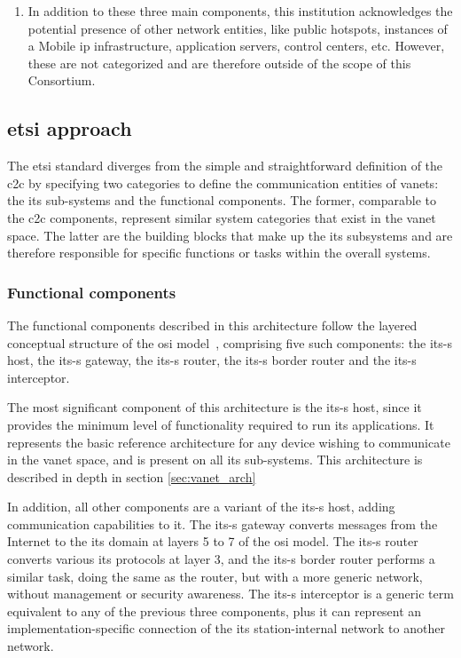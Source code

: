 \begin{enumerate}
    \item In addition to these three main components, this institution acknowledges the potential presence of other network entities, like public hotspots, instances of a Mobile \gls{ip} infrastructure, application servers, control centers, etc. However, these are not categorized and are therefore outside of the scope of this Consortium.

\end{enumerate}

\subsection[ETSI approach]{\gls{etsi} approach}

The \gls{etsi} standard diverges from the simple and straightforward definition of the \gls{c2c} by specifying two categories to define the communication entities of \glspl{vanet}: the \gls{its} sub-systems and the functional components. The former, comparable to the \gls{c2c} components, represent similar system categories that exist in the \gls{vanet} space. The latter are the building blocks that make up the \gls{its} subsystems and are therefore responsible for specific functions or tasks within the overall systems.

\subsubsection{Functional components}

The functional components described in this architecture follow the layered conceptual structure of the \gls{osi} model~\cite{etsi_intelligent_2010}, comprising five such components: the \gls{its-s} host, the \gls{its-s} gateway, the \gls{its-s} router, the \gls{its-s} border router and the \gls{its-s} interceptor.

The most significant component of this architecture is the \gls{its-s} host, since it provides the minimum level of functionality required to run \gls{its} applications. It represents the basic reference architecture for any device wishing to communicate in the \gls{vanet} space, and is present on all \gls{its} sub-systems. This architecture is described in depth in section \ref{sec:vanet_arch} 

In addition, all other components are a variant of the \gls{its-s} host, adding communication capabilities to it. The \gls{its-s} gateway converts messages from the Internet to the \gls{its} domain at layers 5 to 7 of the \gls{osi} model. The \gls{its-s} router converts various \gls{its} protocols at layer 3, and the \gls{its-s} border router performs a similar task, doing the same as the router, but with a more generic network, without management or security awareness. The \gls{its-s} interceptor is a generic term equivalent to any of the previous three components, plus it can represent an implementation-specific connection of the \gls{its} station-internal network to another network.


